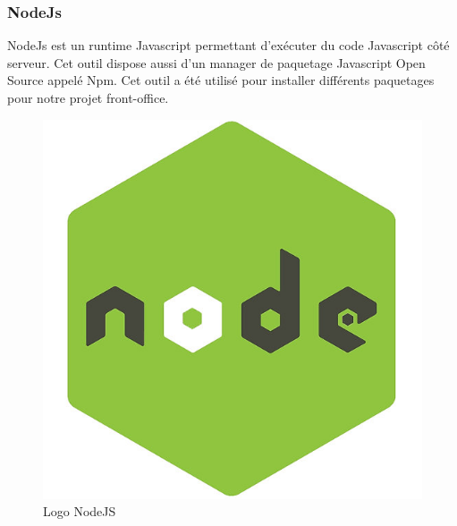 \subsubsection{NodeJs}
\noindent\begin{minipage}{0.69\textwidth}
NodeJs est un runtime Javascript permettant d’exécuter du code Javascript côté serveur. Cet outil dispose aussi d'un manager de paquetage Javascript Open Source appelé Npm. Cet outil a été utilisé pour installer différents paquetages pour notre projet front-office.
\end{minipage}
\begin{minipage}{0.3\textwidth}
\begin{figure}[H]
  \centering
  \includegraphics[scale=0.12]{figures/logo/nodejs.jpg}
  \caption{Logo NodeJS}
  \label{code36}
\end{figure}
\end{minipage}
